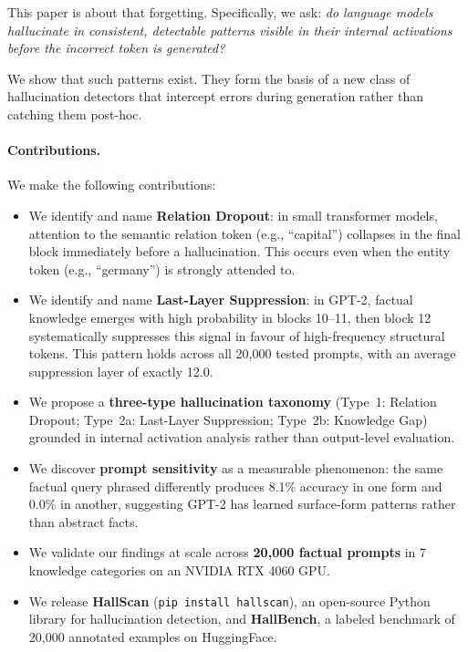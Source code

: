 \documentclass[11pt,a4paper]{article}
\begin{document}
This paper is about that forgetting. Specifically, we ask:
\emph{do language models hallucinate in consistent, detectable
patterns visible in their internal activations before the
incorrect token is generated?}

We show that such patterns exist. They form the basis of a
new class of hallucination detectors that intercept errors
during generation rather than catching them post-hoc.

\paragraph{Contributions.} We make the following contributions:

\begin{itemize}
    \item We identify and name \textbf{Relation Dropout}: in
    small transformer models, attention to the semantic relation
    token (e.g., ``capital'') collapses in the final block
    immediately before a hallucination. This occurs even when
    the entity token (e.g., ``germany'') is strongly attended to.

    \item We identify and name \textbf{Last-Layer Suppression}:
    in GPT-2, factual knowledge emerges with high probability
    in blocks 10--11, then block 12 systematically suppresses
    this signal in favour of high-frequency structural tokens.
    This pattern holds across all 20,000 tested prompts,
    with an average suppression layer of exactly 12.0.

    \item We propose a \textbf{three-type hallucination taxonomy}
    (Type~1: Relation Dropout; Type~2a: Last-Layer Suppression;
    Type~2b: Knowledge Gap) grounded in internal activation
    analysis rather than output-level evaluation.

    \item We discover \textbf{prompt sensitivity} as a
    measurable phenomenon: the same factual query phrased
    differently produces 8.1\% accuracy in one form and 0.0\%
    in another, suggesting GPT-2 has learned surface-form
    patterns rather than abstract facts.

    \item We validate our findings at scale across
    \textbf{20,000 factual prompts} in 7 knowledge categories
    on an NVIDIA RTX 4060 GPU.

    \item We release \textbf{HallScan}
    (\texttt{pip install hallscan}), an open-source Python
    library for hallucination detection, and \textbf{HallBench},
    a labeled benchmark of 20,000 annotated examples on
    HuggingFace.
\end{itemize}
\end{document}
